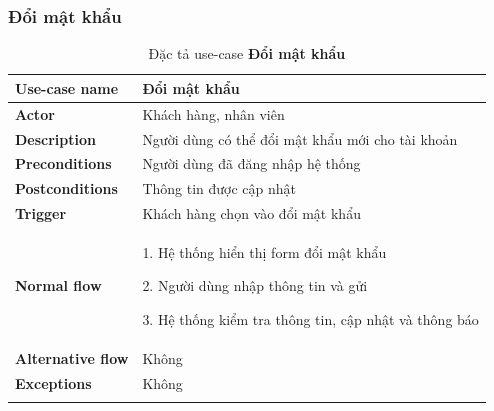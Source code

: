 \subsubsection{Đổi mật khẩu}
{
    \setlength\extrarowheight{6pt}
    \begin{longtable}{| p{} | p{} |}
        \hline
        \textbf{Use-case name}
         &
        Đổi mật khẩu
        \\
        \hline
        \textbf{Actor}
         &
        Khách hàng, nhân viên
        \\
        \hline
        \textbf{Description}
         &
        Người dùng có thể đổi mật khẩu mới cho tài khoản
        \\
        \hline
        \textbf{Preconditions}
         &
        Người dùng đã đăng nhập hệ thống
        \\
        \hline
        \textbf{Postconditions}
         &
        Thông tin được cập nhật
        \\
        \hline
        \textbf{Trigger}
         &
        Khách hàng chọn vào đổi mật khẩu
        \\
        \hline
        \begin{flushleft}
            \textbf{Normal flow}
        \end{flushleft}
         &
        1. Hệ thống hiển thị form đổi mật khẩu

        2. Người dùng nhập thông tin và gửi

        3. Hệ thống kiểm tra thông tin, cập nhật và thông báo
        \\
        \hline
        \textbf{Alternative flow}
         &
        Không
        \\
        \hline
        \textbf{Exceptions}
         &
        Không
        \\
        \hline
        \caption{Đặc tả use-case \textbf{Đổi mật khẩu}}
    \end{longtable}
}

\newpage

